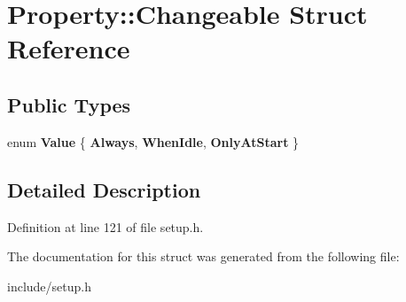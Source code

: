 \hypertarget{structProperty_1_1Changeable}{\section{Property\-:\-:Changeable Struct Reference}
\label{structProperty_1_1Changeable}
}
\subsection*{Public Types}
\begin{DoxyCompactItemize}
\item 
enum {\bfseries Value} \{ {\bfseries Always}, 
{\bfseries When\-Idle}, 
{\bfseries Only\-At\-Start}
 \}
\end{DoxyCompactItemize}


\subsection{Detailed Description}


Definition at line 121 of file setup.\-h.



The documentation for this struct was generated from the following file\-:\begin{DoxyCompactItemize}
\item 
include/setup.\-h\end{DoxyCompactItemize}
